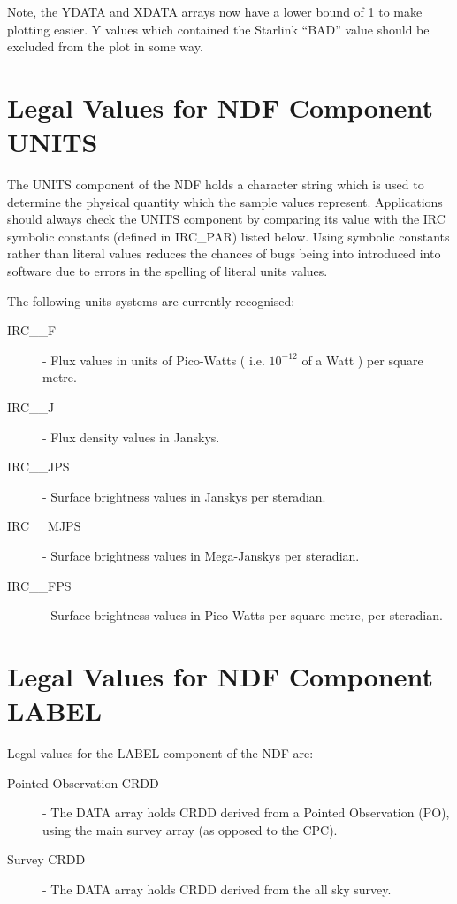 \begin{enumerate}
\begin{quote}
\begin{tabbing}
\end{tabbing}
\end{quote}

Note, the YDATA and XDATA arrays now have a lower bound of 1 to make plotting
easier. Y values which contained the Starlink ``BAD'' value should be excluded
from the plot in some way. 

\end{enumerate}
\section {Legal Values for NDF Component UNITS}
\label{APP:UNITS}
The UNITS component of the NDF holds a character string which is used to 
determine the physical quantity which the sample values represent. Applications 
should always check the UNITS component by comparing its value with the 
IRC symbolic constants (defined in IRC\_PAR) listed below. Using symbolic 
constants rather than literal values reduces the chances of bugs being into 
introduced into software due to errors in the spelling of literal units values.

The following units systems are currently recognised:
\begin{description}
\item [IRC\_\_F] - Flux values in units of Pico-Watts ( i.e. $10^{-12}$ of a 
Watt ) per square metre.
\item [IRC\_\_J] - Flux density values in Janskys. 
\item [IRC\_\_JPS] - Surface brightness values in Janskys per steradian. 
\item [IRC\_\_MJPS] - Surface brightness values in Mega-Janskys per steradian. 
\item [IRC\_\_FPS] - Surface brightness values in Pico-Watts per square metre,
per steradian. 
\end{description}

\section {Legal Values for NDF Component LABEL}
\label{APP:LABEL}
Legal values for the LABEL component of the NDF are:
\begin{description}
\item [Pointed Observation CRDD] - The DATA array holds CRDD derived
from a Pointed Observation (PO), using the main survey array (as opposed to the 
CPC).
\item [Survey CRDD] - The DATA array holds CRDD derived from the all sky survey.
\end{description}

